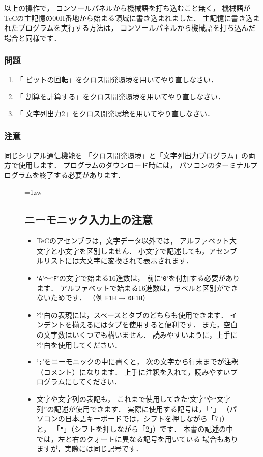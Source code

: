 以上の操作で，
コンソールパネルから機械語を打ち込むこと無く，
機械語がTeCの主記憶の00H番地から始まる領域に書き込まれました．
主記憶に書き込まれたプログラムを実行する方法は，
コンソールパネルから機械語を打ち込んだ場合と同様です．

\newpage
\subsubsection{問題}
\begin{enumerate}
\item 「 ビットの回転」をクロス開発環境を用いてやり直しなさい．
\item 「 割算を計算する」をクロス開発環境を用いてやり直しなさい．
\item 「 文字列出力2」をクロス開発環境を用いてやり直しなさい．
\end{enumerate}

\subsubsection{注意}
同じシリアル通信機能を
「クロス開発環境」と「文字列出力プログラム」の両方で使用します．
プログラムのダウンロード時には，
パソコンのターミナルプログラムを終了する必要があります．

\begin{figure}[btp]
\begin{framed}{\parindent=1zw
\subsection*{ニーモニック入力上の注意}

\begin{itemize}
\item TeCのアセンブラは，文字データ以外では，
アルファベット大文字と小文字を区別しません．
小文字で記述しても，アセンブルリストには大文字に変換されて表示されます．
\item `{\tt A}'〜`{\tt F}'の文字で始まる16進数は，
前に`{\tt 0}'を付加する必要があります．
アルファベットで始まる16進数は，ラベルと区別ができないためです．
（例 {\tt F1H} → {\tt 0F1H}）
\item 空白の表現には，スペースとタブのどちらも使用できます．
インデントを揃えるにはタブを使用すると便利です．
また，空白の文字数はいくつでも構いません．
読みやすいように，上手に空白を使用してください．
\item `{\tt ;}'をニーモニックの中に書くと，
次の文字から行末までが注釈（コメント）になります．
上手に注釈を入れて，読みやすいプログラムにしてください．
\item 文字や文字列の表記も，
これまで使用してきた`文字'や``文字列''の記述が使用できます．
実際に使用する記号は，「{\tt '}」
（パソコンの日本語キーボードでは，シフトを押しながら「7」）と，
「{\tt "}」（シフトを押しながら「2」）です．
本書の記述の中では，左と右のクォートに異なる記号を用いている
場合もありますが，実際には同じ記号です．
\end{itemize}
}\end{framed}
\end{figure}

